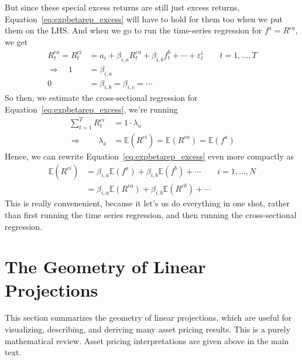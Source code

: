 \documentclass[12pt]{article}
\theoremstyle{plain}
\theoremstyle{definition}
\theoremstyle{remark}
\begin{document}
But since these special excess returns are still just excess returns,
Equation~\ref{eq:expbetarep_excess} will have to hold for them too when
we put them on the LHS. And when we go to run the time-series
regression for $f^a = R^{ea}$, we get
\begin{align*}
  R_t^{ea} = R^{ei}_t
  &= a_i + \beta_{i,a} R_t^{ea} + \beta_{i,b} f_t^b + \cdots
  + \varepsilon^i_t
  \qquad t = 1,\ldots,T\\
  \Rightarrow\quad
  1 &= \beta_{i,a} \\
  0 &= \beta_{i,b} = \beta_{i,c} =\cdots
\end{align*}
So then, we estimate the cross-sectional regression for
Equation~\ref{eq:expbetarep_excess}, we're running
\begin{align*}
  \sum^T_{t=1} R^{ei}_t &= 1 \cdot \lambda_a \\
  \Rightarrow\qquad
  \lambda_a &= \mathbb{E}(R^{ei}) = \mathbb{E}(R^{ea})
   = \mathbb{E}(f^{a})
\end{align*}
Hence, we can rewrite Equation~\ref{eq:expbetarep_excess} even more
compactly as
\begin{align*}
  \mathbb{E}(R^{ei})
  &=
  \beta_{i,a}\mathbb{E}(f^a) +
  \beta_{i,b}\mathbb{E}(f^b) +
  \cdots
  \qquad i = 1,\ldots,N \\
  &=
  \beta_{i,a}\mathbb{E}(R^{ea}) +
  \beta_{i,b}\mathbb{E}(R^{eb}) +
  \cdots
\end{align*}
This is really convenenient, because it let's us do everything in one
shot, rather than first running the time series regression, and then
running the cross-sectional regression.



\newpage
\appendix
\section{The Geometry of Linear Projections}

This section summarizes the geometry of linear projections, which are
useful for visualizing, describing, and deriving many asset pricing
results. This is a purely mathematical review. Asset pricing
interpretations are given above in the main text.
\end{document}
